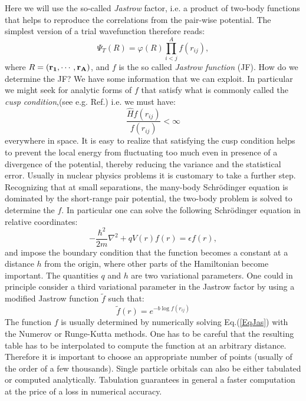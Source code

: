 Here we will use the so-called {\it Jastrow} factor, i.e. a product of two-body functions  that helps to reproduce the correlations from the pair-wise potential. The simplest version of a trial wavefunction therefore reads:
\begin{equation}
\Psi_T(R)=\varphi(R)\prod_{i<j}^Af(r_{ij}),
\end{equation}
where $R=({\bf r_1,\cdots,r_A})$, and $f$ is the so called {\it Jastrow function} (JF). How do we determine the JF? We have some information that we can exploit. In particular we might seek for analytic forms of $f$ that satisfy what is commonly called the {\it cusp condition},(see e.g. Ref.\cite{Cep77}) i.e. we must have:
\begin{equation}
\frac{\hat{H}f(r_{ij})}{f(r_{ij})}<\infty
\end{equation}
everywhere in space. It is easy to realize that satisfying the cusp condition helps to prevent the local energy from fluctuating too much even in presence of a divergence of the potential, thereby reducing the variance and the statistical error. Usually in nuclear physics problems it is customary to take a further step.
Recognizing that at small separations, the many-body Schr\"odinger equation
is dominated by the short-range pair potential,
the two-body problem is solved to determine the $f$. In particular one can solve the following Schr\"odinger equation in relative coordinates:
\begin{equation}
\label{EqJas}
-\frac{\hbar^2}{2m}\nabla^2+qV(r)f(r)=\epsilon f(r),
\end{equation}
and impose the boundary condition that the function becomes a constant at a distance $h$ from the origin, where other parts of the Hamiltonian become important.  The quantities $q$ and $h$ are two variational parameters. One could in principle consider a third variational parameter in the Jastrow factor by using a modified Jastrow function $\tilde{f}$ such that:\begin{equation}
\tilde{f}(r)=e^{-b\log f(r_{ij})}
\end{equation}
The function $f$ is usually determined by numerically solving Eq.(\ref{EqJas}) with the Numerov or Runge-Kutta methods. One has to be careful that the resulting table has to be interpolated to compute the function at an arbitrary distance. Therefore it is important to choose an appropriate number of points (usually of the order of a few thousands).  
Single particle orbitals can also be either tabulated or computed analytically. Tabulation guarantees in general a faster computation at the price of a loss in numerical accuracy.

